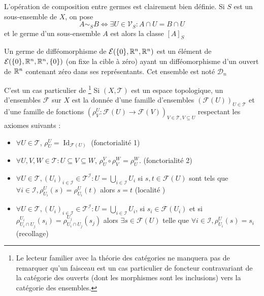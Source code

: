 \documentclass[memoire.tex]{subfiles}
\begin{document}
L'opération de composition entre germes est clairement bien 
définie. Si $S$ est un sous-ensemble de $X$, on pose 
\begin{equation*}
    A\sim_S B\Leftrightarrow \exists U\in\mathcal{V}_S: A\cap U=B\cap U
\end{equation*}
et le germe d'un sous-ensemble $A$ est alors la classe $[A]_S$
\begin{definition}
    Un germe  de difféomorphisme de $\mathcal{E}(\{0\},\mathbb{R}^n,
    \mathbb{R}^n)$ est un élément de $\mathcal{E}(\{0\},\mathbb{R}^n,\mathbb{R}^n,
    \{0\})$ 
    (on fixe la cible à zéro) ayant un difféomorphisme d'un 
    ouvert de $\mathbb{R}^n$ contenant zéro dans ses représentants. 
    Cet ensemble est noté $\mathcal{D}_n$
\end{definition}




\begin{remarque}\label{remsheaf}
    C'est un cas particulier de \footnote{Le lecteur familier avec la théorie des catégories ne manquera pas de remarquer qu'un faisceau est un cas particulier de foncteur contravariant de la catégorie des ouverts (dont les morphismes sont les inclusions) vers la catégorie des ensembles.}
    Si $(X,\mathcal{T})$ est un espace topologique, un  d'ensembles $\mathcal{F}$ sur $X$ est la donnée d'une famille d'ensembles $(\mathcal{F}(U))_{U\in \mathcal{T} }$ et d'une famille de fonctions $(\rho^U_V: \mathcal{F}(U)\rightarrow\mathcal{F}(V))_{V\in \mathcal{T}, V\subseteq U}$ respectant les axiomes suivants :
    \begin{itemize}
        \item $\forall U\in\mathcal{T}$, $\rho^U_U = \operatorname{Id}_{\mathcal{F}(U)}$ (fonctorialité 1)
        \item $\forall U,V,W\in\mathcal{T}: U\subseteq V\subseteq W$, $\rho^V_U\circ \rho^W_V=\rho^W_U$. (fonctorialité 2)
        \item $\forall U\in\mathcal{T}, (U_i)_{i\in\mathcal{I}}\in\mathcal{T}^{\mathcal{I}}: U=\bigcup_{i\in\mathcal{I}}U_i$ si $s,t\in\mathcal{F}(U)$ sont tels que \\$ \forall i\in\mathcal{I},\rho^U_{U_i}(s)=\rho^U_{U_i}(t)$ alors $s=t$ (localité )
        \item $\forall U\in\mathcal{T}, (U_i)_{i\in\mathcal{I}}\in\mathcal{T}^{\mathcal{I}}: U=\bigcup_{i\in\mathcal{I}}U_i$, si $s_i\in\mathcal{F}(U_i)$ et si $\rho^{U_i}_{U_i\cap U_j}(s_i)=\rho^{U_j}_{U_i\cap U_j}(s_j)$ alors $\exists s\in\mathcal{F}(U)$ telle que $\forall i\in\mathcal{I},\rho^U_{U_i}(s)=s_i$ (recollage)

\end{itemize}
\end{remarque}
\end{document}

